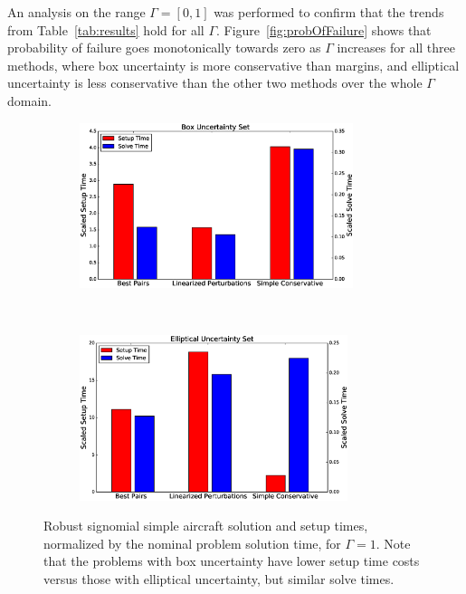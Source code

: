 An analysis on the range $\Gamma=[0,1]$ was performed to confirm that the trends from
Table~\ref{tab:results} hold for all $\Gamma$. Figure~\ref{fig:probOfFailure}
shows that probability of failure goes monotonically
towards zero as $\Gamma$ increases for all three methods, where box uncertainty is
more conservative than margins, and elliptical uncertainty is less conservative
than the other two methods over the whole $\Gamma$ domain.

\begin{figure}[h!]
    \centering
    \captionsetup{justification=centering, font=small}
    \begin{subfigure}{0.49\textwidth}
        \centering
        \includegraphics[height=1.9in]{box_sst.eps}
    \end{subfigure}
    ~
    \begin{subfigure}{0.49\textwidth}
        \centering
        \includegraphics[height=1.9in]{ell_sst.eps}
    \end{subfigure}
    \caption{Robust signomial simple aircraft solution and setup times, normalized by the
    nominal problem solution time, for $\Gamma = 1$.
    Note that the problems with box uncertainty have lower setup
    time costs versus those with elliptical uncertainty, but similar solve times.}
    \label{compare_signomial}
\end{figure}

